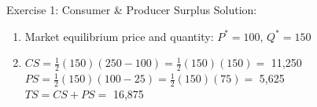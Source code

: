 \documentclass[9pt, handout]{beamer}
\begin{document}
\begin{frame}{Exercise 1: Consumer \& Producer Surplus}
    Solution: 
    \begin{enumerate}
        \item Market equilibrium price and quantity: $P^*=100$, $Q^*=150$
        \vspace{5pt}
        \item $CS = \frac{1}{2}(150)(250 - 100)=\frac{1}{2}(150)(150) =$ 11,250\\
        \vspace{5pt}
        $PS = \frac{1}{2}(150)(100 - 25) = \frac{1}{2}(150)(75) =$ 5,625\\
        \vspace{5pt}
        $TS = CS + PS =$ 16,875
    \end{enumerate}
\end{frame}


\end{document}
